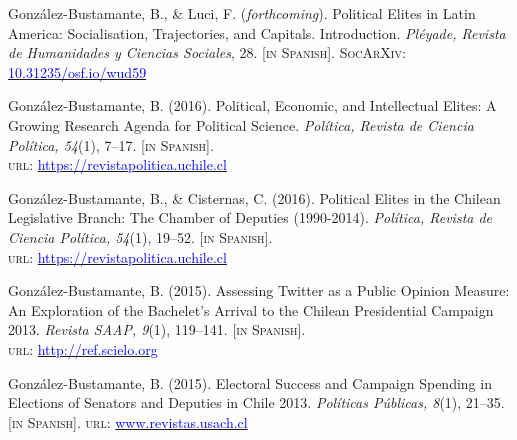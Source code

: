 
\begin{publications}

\begin{benumerate}{10}
\item{\small Gonz\'alez-Bustamante, B., \& Luci, F. ({\itshape forthcoming}). Political Elites in Latin America: Socialisation, Trajectories, and Capitals. Introduction. {\itshape Pléyade, Revista de Humanidades y Ciencias Sociales}, 28. {\footnotesize \scshape [in Spanish]}. {\scshape \footnotesize SocArXiv}: \href{https://doi.org/10.31235/osf.io/wud59}{\textcolor{blue}{10.31235/osf.io/wud59}}}\vspace{1mm}

\item{\small Gonz\'alez-Bustamante, B. (2016). Political, Economic, and Intellectual Elites: A Growing Research Agenda for Political Science. {\itshape Pol\'itica, Revista de Ciencia Pol\'itica, 54}(1), 7--17. {\footnotesize \scshape [in Spanish]}. \\ {\scshape url}: \href{https://revistapolitica.uchile.cl/index.php/RP/article/view/42690}{\textcolor{blue}{https://revistapolitica.uchile.cl}}}\vspace{1mm}

\item{\small Gonz\'alez-Bustamante, B., \& Cisternas, C. (2016). Political Elites in the Chilean Legislative Branch: The Chamber of Deputies (1990-2014). {\itshape Pol\'itica, Revista de Ciencia Pol\'itica, 54}(1), 19--52. {\footnotesize \scshape [in Spanish]}. \\ {\scshape url}: \href{https://revistapolitica.uchile.cl/index.php/RP/article/view/42691}{\textcolor{blue}{https://revistapolitica.uchile.cl}}}\vspace{1mm}

\item{\small Gonz\'alez-Bustamante, B. (2015). Assessing Twitter as a Public Opinion Measure: An Exploration of the Bachelet's Arrival to the Chilean Presidential Campaign 2013. {\itshape Revista SAAP, 9}(1), 119--141. {\footnotesize \scshape [in Spanish]}. \\ {\scshape url}: \href{http://ref.scielo.org/dwzhns}{\textcolor{blue}{http://ref.scielo.org}}} \vspace{1mm}

\item{\small Gonz\'alez-Bustamante, B. (2015). Electoral Success and Campaign Spending in Elections of Senators and Deputies in Chile 2013. {\itshape Pol\'iticas P\'ublicas, 8}(1), 21--35. {\footnotesize \scshape [in Spanish]}. {\scshape url}: \href{http://www.revistas.usach.cl/ojs/index.php/politicas/article/view/2182}{\textcolor{blue}{www.revistas.usach.cl}}} \vspace{1mm}


\end{benumerate}
\end{publications}
